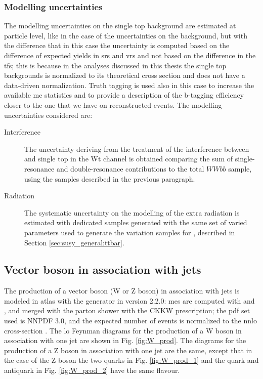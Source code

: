 \subsubsection*{Modelling uncertainties}

The modelling uncertainties on the single top background are estimated at particle level, 
like in the case of the uncertainties on the \ttbar background, but with the difference that in this case the uncertainty is computed based on the difference of expected yields in \glspl{sr} and \glspl{vr} and not based on the difference in the \glspl{tf}; 
this is because in the analyses discussed in this thesis the single top backgrounds is normalized to its theoretical cross section and does not have a data-driven normalization. Truth tagging is used also in this case to increase the available \gls{mc} statistics and to provide a description of the b-tagging efficiency closer to the one that we have on reconstructed events. The modelling uncertainties considered are: 

\begin{description}
\item[Interference] The uncertainty deriving from the treatment of the interference between \ttbar and single top in the Wt channel is obtained comparing the sum of single-resonance and double-resonance contributions to the total $WWbb$ sample, using the samples described in the previous paragraph.

\item[Radiation] The systematic uncertainty on the modelling of the extra radiation is estimated with dedicated samples generated with the same set of varied parameters used to generate the variation samples for \ttbar, described in Section \ref{sec:susy_general:ttbar}. 

\end{description}

\subsection{Vector boson in association with jets}

The production of a vector boson (W or Z boson) in association with jets is modeled in \gls{atlas} with the \Sherpa generator in version 2.2.0: \glspl{me} are 
computed with \comix \cite{Gleisberg:2008fv} and \OL \cite{Cascioli:2011va}, and merged with the \Sherpa parton shower with the CKKW prescription; the \gls{pdf} set used is NNPDF 3.0, and the expected number of events is normalized to the \gls{nnlo} cross-section \cite{Catani:2009sm}.
The \gls{lo} Feynman diagrams for the production of a W boson in association with one jet are shown in Fig. \ref{fig:W_prod}. 
The diagrams for the production of a Z boson in association with one jet are the same, except that in the case of the Z boson the 
two quarks in Fig. \ref{fig:W_prod_1} and the quark and antiquark in Fig. \ref{fig:W_prod_2} have the same flavour. 

